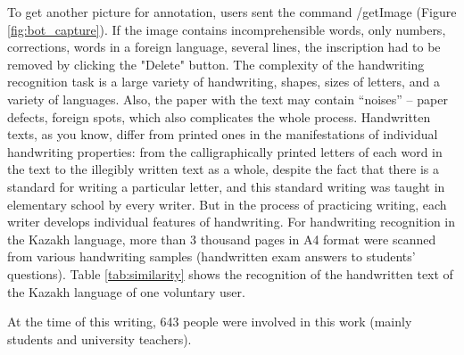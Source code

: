 \documentclass[preprint,12pt]{elsarticle}
\begin{document}
To get another picture for annotation, users sent the command /getImage (Figure \ref{fig:bot_capture}).
If the image contains incomprehensible words, only numbers, corrections, words in a foreign language, several lines, the inscription had to be removed by clicking the "Delete" button.
The complexity of the handwriting recognition task is a large variety of handwriting, shapes, sizes of letters, and a variety of languages. Also, the paper with the text may contain ``noises'' – paper defects, foreign spots, which also complicates the whole process.  Handwritten texts, as you know, differ from printed ones in the manifestations of individual handwriting properties: from the calligraphically printed letters of each word in the text to the illegibly written text as a whole, despite the fact that there is a standard for writing a particular letter, and this standard writing was taught in elementary school by every writer. But in the process of practicing writing, each writer develops individual features of handwriting.
For handwriting recognition in the Kazakh language, more than 3 thousand pages in A4 format were scanned from various handwriting samples (handwritten exam answers to students' questions). Table \ref{tab:similarity} shows the recognition of the handwritten text of the Kazakh language of one voluntary user.

At the time of this writing, 643 people were involved in this work (mainly students and university teachers).
\end{document}
